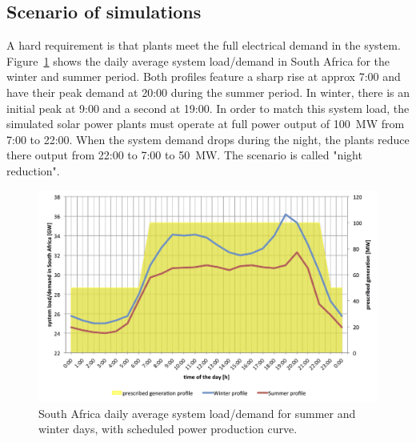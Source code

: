 \subsection{Scenario of simulations} \label{Overall simulated configuration}
A hard requirement is that plants meet the full electrical demand in the system. Figure~\ref{LoadScenarios} shows the daily average system load/demand in South Africa for the winter and summer period.
Both profiles feature a sharp rise at approx 7:00 and have their peak demand at 20:00 during the summer period.
In winter, there is an initial peak at 9:00 and a second at 19:00.
In order to match this system load, the simulated solar power plants must operate at full power output of \SI{100}{MW} from 7:00 to 22:00. When the system demand drops during the night, the plants reduce there output from 22:00 to 7:00 to \SI{50}{MW}. The scenario is called "night reduction".
\begin{figure}[htbp]  
\centering
\includegraphics[width=1\linewidth]{FIG/LoadScenarios}
\caption[South Africa daily average system load/demand for summer and winter days, with scheduled power production curve.]{South Africa daily average system load/demand for summer and winter days, with scheduled power production curve.}\label{LoadScenarios}
\end{figure}
